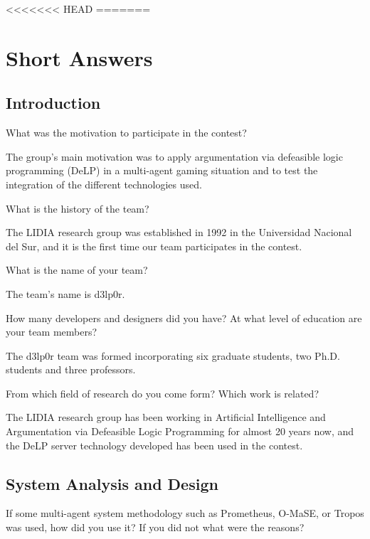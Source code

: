 <<<<<<< HEAD
=======

\section{Short Answers}


\subsection{Introduction}

\begin{question}
What was the motivation to participate in the contest?  
\end{question}

The group's main motivation was to apply argumentation via defeasible 
logic programming (DeLP) in a multi-agent gaming situation and to test the
integration of the different technologies used.

\begin{question}
What is the history of the team?  
\end{question}

The LIDIA research group was established in 1992 in the Universidad 
Nacional del Sur, and it is the first time our team participates in the 
contest.

\begin{question}
What is the name of your team?  
\end{question}

The team's name is d3lp0r.

\begin{question}
How many developers and designers did you have?  At what level of education
are your team members?  
\end{question}

The d3lp0r team was formed incorporating six graduate
students, two Ph.D. students and three professors.

\begin{question}
From which field of research do you come form?  Which work is related?  
\end{question}

The LIDIA research group has been working in Artificial Intelligence and
Argumentation via Defeasible Logic Programming for almost 20 years now, and
the DeLP server technology developed has been used in the contest.

\subsection{System Analysis and Design}
\setcounter{question}{0}
\begin{question}
If some multi-agent system methodology such
as Prometheus, O-MaSE, or Tropos was used, how did you use it? If you did not
what were the reasons?  
\end{question}

